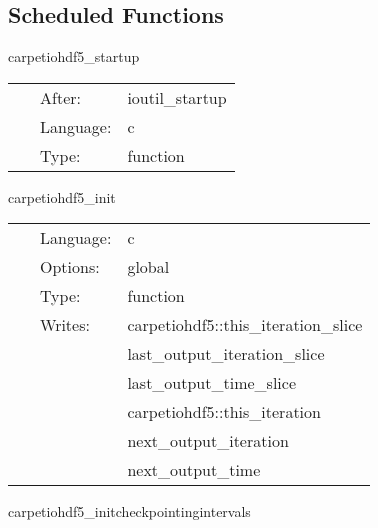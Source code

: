 \documentclass{article}
\begin{document}
\subsection*{Scheduled Functions}
\vspace{5mm}


\hspace{5mm} carpetiohdf5\_startup 

\hspace{5mm}{\it startup routine } 


\hspace{5mm}

 \begin{tabular*}{160mm}{cll} 
~ & After:  & ioutil\_startup \\ 
~ & Language:  & c \\ 
~ & Type:  & function \\ 
\end{tabular*} 


\vspace{5mm}


\hspace{5mm} carpetiohdf5\_init 

\hspace{5mm}{\it initialisation routine } 


\hspace{5mm}

 \begin{tabular*}{160mm}{cll} 
~ & Language:  & c \\ 
~ & Options:  & global \\ 
~ & Type:  & function \\ 
~ & Writes:  & carpetiohdf5::this\_iteration\_slice \\ 
~& ~ &last\_output\_iteration\_slice\\ 
~& ~ &last\_output\_time\_slice\\ 
~& ~ &carpetiohdf5::this\_iteration\\ 
~& ~ &next\_output\_iteration\\ 
~& ~ &next\_output\_time\\ 
\end{tabular*} 


\vspace{5mm}


\hspace{5mm} carpetiohdf5\_initcheckpointingintervals 
\end{document}
